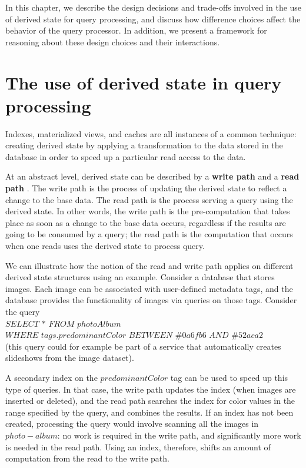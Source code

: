 In this chapter, we describe the design decisions and trade-offs involved in the use of derived state for query processing,
and discuss how difference choices affect the behavior of the query processor.
In addition, we present a framework for reasoning about these design choices and their interactions.

\section{The use of derived state in query processing}

Indexes, materialized views, and caches are all instances of a common technique:
creating derived state by applying a transformation to the data stored in the database in order to speed up a particular
read access to the data.

At an abstract level, derived state can be described by a \textbf{write path} and a \textbf{read path}
\cite{kleppmann:designing}.
The write path is the process of updating the derived state to reflect a change to the base data.
The read path is the process serving a query using the derived state.
In other words, the write path is the pre-computation that takes place as soon as a change to the base data occurs,
regardless if the results are going to be consumed by a query;
the read path is the computation that occurs when one reads uses the derived state to process query.

\medskip

We can illustrate how the notion of the read and write path applies on different derived state structures using an example.
Consider a database that stores images.
Each image can be associated with user-defined metadata tags, and the database provides the functionality of
images via queries on those tags.
Consider the query \\

\noindent
$SELECT$ $*$ $FROM$ $photoAlbum$ \\
$WHERE$ $tags.predominantColor$ $BETWEEN$ $\#0a6fb6$ $AND$ $\#52aca2$ \\

\noindent
(this query could for example be part of a service that automatically creates slideshows from the image dataset).

A secondary index on the $predominantColor$ tag can be used to speed up this type of queries.
In that case, the write path updates the index (when images are inserted or deleted), and the read path searches the
index for color values in the range specified by the query, and combines the results.
If an index has not been created, processing the query would involve scanning all the images in $photo-album$:
no work is required in the write path, and significantly more work is needed in the read path.
Using an index, therefore, shifts an amount of computation from the read to the write path.


